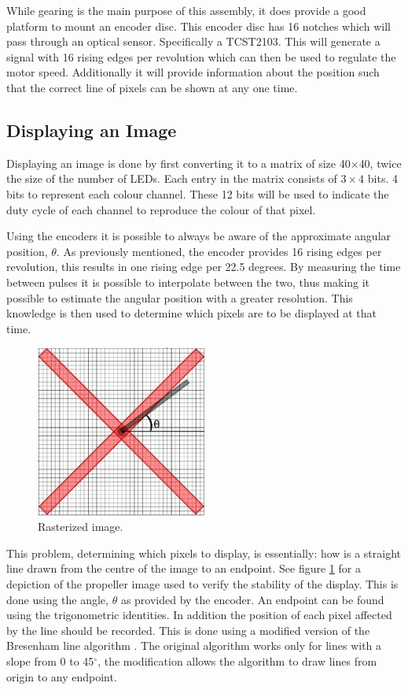 While gearing is the main purpose of this assembly, it does provide a good platform to mount an encoder disc.
This encoder disc has 16 notches which will pass through an optical sensor. 
Specifically a TCST2103.
This will generate a signal with 16 rising edges per revolution which can then be used to regulate the motor speed.
Additionally it will provide information about the position such that the correct line of pixels can be shown at any one time.

\subsection{Displaying an Image}
Displaying an image is done by first converting it to a matrix of size 40$\times$40, twice the size of the number of LEDs.
Each entry in the matrix consists of $3\times4$ bits. 4 bits to represent each colour channel.
These 12 bits will be used to indicate the duty cycle of each channel to reproduce the colour of that pixel.

Using the encoders it is possible to always be aware of the approximate angular position, $\theta$.
As previously mentioned, the encoder provides 16 rising edges per revolution, this results in one rising edge per 22.5 degrees.
By measuring the time between pulses it is possible to interpolate between the two, thus making it possible to estimate the angular position with a greater resolution.
This knowledge is then used to determine which pixels are to be displayed at that time.

\begin{figure}[H]
		\centering
		\includegraphics[width =0.5\textwidth]{images/rasterized_image}
		\caption{Rasterized image.}
		\label{fig:rasterized}
\end{figure}

This problem, determining which pixels to display, is essentially: how is a straight line drawn from the centre of the image to an endpoint.
See figure \ref{fig:rasterized} for a depiction of the propeller image used to verify the stability of the display.
This is done using the angle, $\theta$ as provided by the encoder.
An endpoint can be found using the trigonometric identities.
In addition the position of each pixel affected by the line should be recorded.
This is done using a modified version of the Bresenham line algorithm \cite{bresenham}.
The original algorithm works only for lines with a slope from 0 to 45$^\circ$, the modification allows the algorithm to draw lines from origin to any endpoint.

